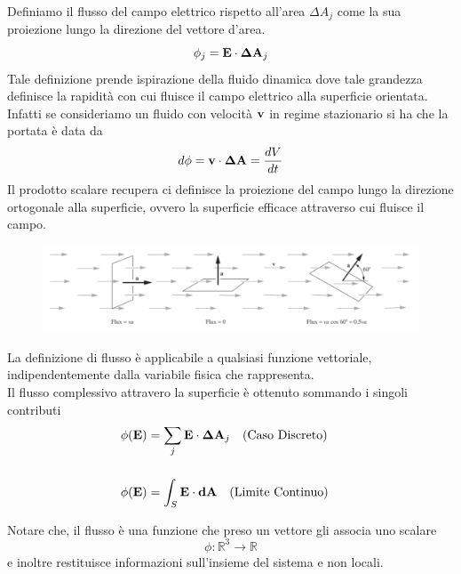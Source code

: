 \noindent  Definiamo il flusso del campo elettrico rispetto all'area $\Delta A_j$ come la sua proiezione lungo la direzione del vettore d'area. 
\begin{equation}
	\phi_j = \bold{E} \cdot \bold{\Delta A}_j 
\end{equation} 
Tale definizione prende ispirazione della fluido dinamica dove tale grandezza definisce la rapidit\`a con cui fluisce  il campo elettrico  alla superficie orientata. Infatti se consideriamo un fluido  con velocit\`a $\bold{v}$ in regime stazionario si ha che la portata \`e data da  
\begin{equation*}
	d\phi = \bold{v} \cdot \bold{\Delta A} = \frac{dV}{dt}
\end{equation*} 
Il prodotto scalare recupera ci definisce la proiezione del campo lungo la direzione ortogonale alla superficie, ovvero la superficie efficace attraverso cui fluisce il campo.
 
\begin{figure}[!ht]
\vspace{0.1in}
\includegraphics[width = 15.5cm]{images/orient}	
\centering
\vspace{0.1in}
\end{figure}
La definizione di flusso \`e applicabile a qualsiasi funzione vettoriale, indipendentemente dalla variabile fisica che rappresenta.
\\
Il flusso complessivo attravero la superficie \`e ottenuto sommando i singoli contributi
\begin{equation*}
	\begin{aligned}
		& \phi(\bold{E}) = \sum_{j} \bold{E}\cdot \bold{\Delta A}_{j} \quad \text{(Caso Discreto)} & \\[0.5cm]
		& \phi(\bold{E}) = \int_{S}\bold{E} \cdot \bold{dA} \quad \text{(Limite Continuo)}
	\end{aligned}
\end{equation*}

\begin{remark}	
\end{remark}

Notare che, il flusso \`e una funzione che preso un vettore gli associa uno scalare 
\begin{equation*}
	\phi : \mathbb{R}^3 \to \mathbb{R}
\end{equation*}
e inoltre restituisce informazioni sull'insieme del sistema e non locali.

